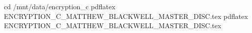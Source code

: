 cd /mnt/data/encryption_c
pdflatex ENCRYPTION_C_MATTHEW_BLACKWELL_MASTER_DISC.tex
pdflatex ENCRYPTION_C_MATTHEW_BLACKWELL_MASTER_DISC.tex